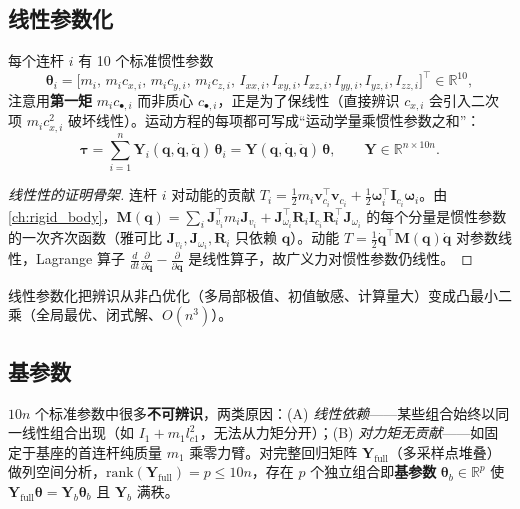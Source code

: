 \subsection{线性参数化}
每个连杆 $i$ 有 10 个标准惯性参数
\begin{equation}
  \boldsymbol\theta_i=\big[m_i,\,m_i c_{x,i},\,m_i c_{y,i},\,m_i c_{z,i},\,I_{xx,i},I_{xy,i},I_{xz,i},I_{yy,i},I_{yz,i},I_{zz,i}\big]^\top\in\mathbb R^{10},
\end{equation}
注意用\textbf{第一矩} $m_i c_{\bullet,i}$ 而非质心 $c_{\bullet,i}$，正是为了保线性（直接辨识 $c_{x,i}$ 会引入二次项 $m_i c_{x,i}^2$ 破坏线性）。运动方程的每项都可写成“运动学量乘惯性参数之和”：
\begin{equation}
  \boldsymbol\tau=\sum_{i=1}^n\mathbf Y_i(\mathbf q,\dot{\mathbf q},\ddot{\mathbf q})\,\boldsymbol\theta_i=\mathbf Y(\mathbf q,\dot{\mathbf q},\ddot{\mathbf q})\,\boldsymbol\theta,\qquad \mathbf Y\in\mathbb R^{n\times 10n}.
  \label{eq:dyn-regressor}
\end{equation}

\begin{proof}[线性性的证明骨架]
连杆 $i$ 对动能的贡献 $T_i=\tfrac12 m_i\mathbf v_{c_i}^\top\mathbf v_{c_i}+\tfrac12\boldsymbol\omega_i^\top\mathbf I_{c_i}\boldsymbol\omega_i$。由 \cref{ch:rigid_body}，$\mathbf M(\mathbf q)=\sum_i\mathbf J_{v_i}^\top m_i\mathbf J_{v_i}+\mathbf J_{\omega_i}^\top\mathbf R_i\mathbf I_{c_i}\mathbf R_i^\top\mathbf J_{\omega_i}$ 的每个分量是惯性参数的一次齐次函数（雅可比 $\mathbf J_{v_i},\mathbf J_{\omega_i},\mathbf R_i$ 只依赖 $\mathbf q$）。动能 $T=\tfrac12\dot{\mathbf q}^\top\mathbf M(\mathbf q)\dot{\mathbf q}$ 对参数线性，Lagrange 算子 $\tfrac{d}{dt}\tfrac{\partial}{\partial\dot{\mathbf q}}-\tfrac{\partial}{\partial\mathbf q}$ 是线性算子，故广义力对惯性参数仍线性。
\end{proof}

线性参数化把辨识从非凸优化（多局部极值、初值敏感、计算量大）变成凸最小二乘（全局最优、闭式解、$O(n^3)$）。

\subsection{基参数}
$10n$ 个标准参数中很多\textbf{不可辨识}，两类原因：(A) \emph{线性依赖}——某些组合始终以同一线性组合出现（如 $I_1+m_1 l_{c1}^2$，无法从力矩分开）；(B) \emph{对力矩无贡献}——如固定于基座的首连杆纯质量 $m_1$ 乘零力臂。对完整回归矩阵 $\mathbf Y_{\text{full}}$（多采样点堆叠）做列空间分析，$\mathrm{rank}(\mathbf Y_{\text{full}})=p\le 10n$，存在 $p$ 个独立组合即\textbf{基参数} $\boldsymbol\theta_b\in\mathbb R^p$ 使 $\mathbf Y_{\text{full}}\boldsymbol\theta=\mathbf Y_b\boldsymbol\theta_b$ 且 $\mathbf Y_b$ 满秩。

